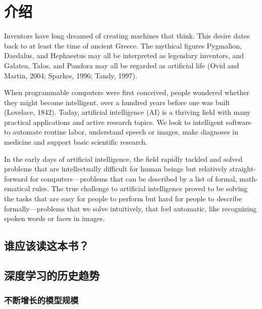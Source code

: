 
\chapter{介绍}
\label{ch:intro}

Inventors have long dreamed of creating machines that think. This desire dates
back to at least the time of ancient Greece. The mythical ﬁgures Pygmalion,
Daedalus, and Hephaestus may all be interpreted as legendary inventors, and
Galatea, Talos, and Pandora may all be regarded as artiﬁcial life (Ovid and Martin,
2004; Sparkes, 1996; Tandy, 1997).

When programmable computers were ﬁrst conceived, people wondered whether
they might become intelligent, over a hundred years before one was built (Lovelace,
1842). Today, artiﬁcial intelligence (AI) is a thriving ﬁeld with many practical
applications and active research topics. We look to intelligent software to automate
routine labor, understand speech or images, make diagnoses in medicine and
support basic scientiﬁc research.

In the early days of artiﬁcial intelligence, the ﬁeld rapidly tackled and solved
problems that are intellectually diﬃcult for human beings but relatively straight-
forward for computers—problems that can be described by a list of formal, math-
ematical rules. The true challenge to artiﬁcial intelligence proved to be solving
the tasks that are easy for people to perform but hard for people to describe
formally—problems that we solve intuitively, that feel automatic, like recognizing
spoken words or faces in images.

\section{谁应该读这本书？}

\section{深度学习的历史趋势}

\subsection{不断增长的模型规模}
\label{subsec:increasing_model_sizes}